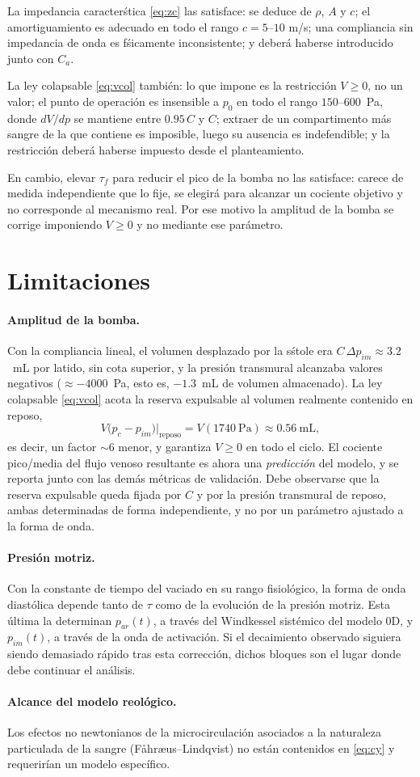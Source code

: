 \documentclass[11pt]{article}
\begin{document}
\noindent
La impedancia caracter\'stica \eqref{eq:zc} las satisface: se deduce de
$\rho$, $A$ y $c$; el amortiguamiento es adecuado en todo el rango $c=5$--$10$
m/s; una compliancia sin impedancia de onda es f\'sicamente inconsistente; y
deber\'a haberse introducido junto con $C_a$.

La ley colapsable \eqref{eq:vcol} tambi\'en: lo que impone es la restricci\'on
$V\ge0$, no un valor; el punto de operaci\'on es insensible a $p_0$ en todo el
rango $150$--$600$~Pa, donde $dV/dp$ se mantiene entre $0.95\,C$ y $C$; extraer
de un compartimento m\'as sangre de la que contiene es imposible, luego su
ausencia es indefendible; y la restricci\'on deber\'a haberse impuesto desde el
planteamiento.

En cambio, elevar $\tau_f$ para reducir el pico de la bomba no las satisface:
carece de medida independiente que lo fije, se elegir\'a para alcanzar un
cociente objetivo y no corresponde al mecanismo real. Por ese motivo la
amplitud de la bomba se corrige imponiendo $V\ge0$ y no mediante ese
par\'ametro.

\section{Limitaciones}

\paragraph{Amplitud de la bomba.} Con la compliancia lineal, el volumen
desplazado por la s\'stole era $C\,\Delta p_{im}\approx3.2$~mL por latido, sin
cota superior, y la presi\'on transmural alcanzaba valores negativos
($\approx-4000$~Pa, esto es, $-1.3$~mL de volumen almacenado). La ley
colapsable \eqref{eq:vcol} acota la reserva expulsable al volumen realmente
contenido en reposo,
\begin{equation}
  V\bigl(p_c-p_{im}\bigr)\Big|_{\text{reposo}}
  =V(1740\ \text{Pa})\approx0.56\ \text{mL},
\end{equation}
es decir, un factor $\sim\!6$ menor, y garantiza $V\ge0$ en todo el ciclo. El
cociente pico/media del flujo venoso resultante es ahora una \emph{predicci\'on}
del modelo, y se reporta junto con las dem\'as m\'etricas de validaci\'on. Debe
observarse que la reserva expulsable queda fijada por $C$ y por la presi\'on
transmural de reposo, ambas determinadas de forma independiente, y no por un
par\'ametro ajustado a la forma de onda.

\paragraph{Presi\'on motriz.} Con la constante de tiempo del vaciado en su
rango fisiol\'ogico, la forma de onda diast\'olica depende tanto de $\tau$ como
de la evoluci\'on de la presi\'on motriz. Esta \'ultima la determinan
$p_{ar}(t)$, a trav\'es del Windkessel sist\'emico del modelo 0D, y $p_{im}(t)$,
a trav\'es de la onda de activaci\'on. Si el decaimiento observado siguiera
siendo demasiado r\'apido tras esta correcci\'on, dichos bloques son el lugar
donde debe continuar el an\'alisis.

\paragraph{Alcance del modelo reol\'ogico.} Los efectos no newtonianos de la
microcirculaci\'on asociados a la naturaleza particulada de la sangre
(F\aa hr\ae us--Lindqvist) no est\'an contenidos en \eqref{eq:cy} y requerir\'ian
un modelo espec\'ifico.
\end{document}
